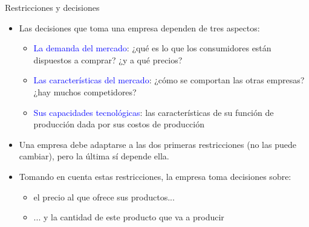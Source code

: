\documentclass{beamer}
\begin{document}
\begin{frame}{Restricciones y decisiones}
    \begin{itemize}
        \item Las decisiones que toma una empresa dependen de tres aspectos:
            \begin{itemize} 
            \item \textcolor{blue}{La demanda del mercado}: ¿qué es lo que los consumidores están dispuestos a comprar? ¿y a qué precios?
            \item  \textcolor{blue}{Las características del mercado}: ¿cómo se comportan las otras empresas? ¿hay muchos competidores?
            \item  \textcolor{blue}{Sus capacidades tecnológicas}: las características de su función de producción dada por sus costos de producción  \vspace{2mm}
            \end{itemize}
        \item Una empresa debe adaptarse a las dos primeras restricciones (no las puede cambiar), pero la última sí depende ella.  \vspace{2mm}
        \item Tomando en cuenta estas restricciones, la empresa toma decisiones sobre:
        \begin{itemize}
            \item el precio al que ofrece sus productos...
            \item ... y la cantidad de este producto que va a producir
        \end{itemize}
    \end{itemize} 
    \end{frame}
\end{document}

